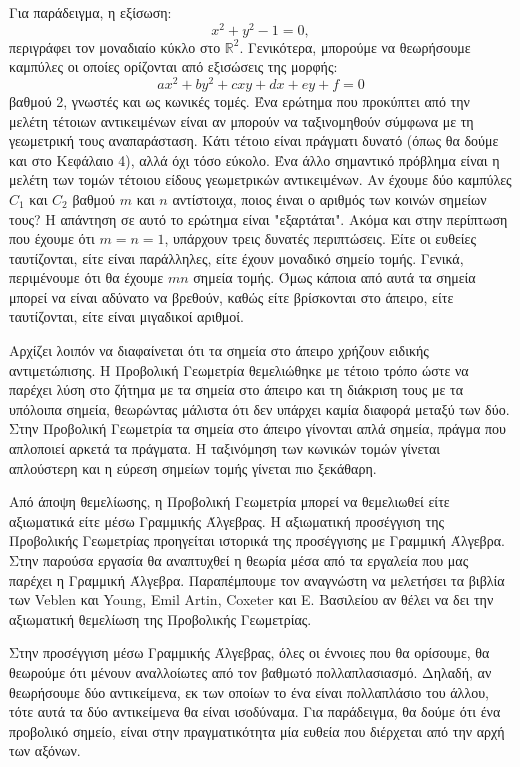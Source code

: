 \documentclass[12pt, a4paper]{book}
\begin{document}
Για παράδειγμα, η εξίσωση:
\begin{equation}
x^2+y^2-1=0,
\end{equation}
περιγράφει τον μοναδιαίο κύκλο στο $\mathbb{R}^2$. Γενικότερα, μπορούμε να θεωρήσουμε καμπύλες οι οποίες ορίζονται από εξισώσεις της μορφής:
\begin{equation}
ax^2+ by^2+cxy+dx+ey+f=0
\end{equation}
βαθμού 2, γνωστές και ως κωνικές τομές. Ένα ερώτημα που προκύπτει από την μελέτη τέτοιων αντικειμένων είναι αν μπορούν να ταξινομηθούν σύμφωνα με τη γεωμετρική τους αναπαράσταση. Κάτι τέτοιο είναι πράγματι δυνατό (όπως θα δούμε και στο Κεφάλαιο 4), αλλά όχι τόσο εύκολο. Ένα άλλο σημαντικό πρόβλημα είναι η μελέτη των τομών τέτοιου είδους γεωμετρικών αντικειμένων. Αν έχουμε δύο καμπύλες $C_1$ και $C_2$ βαθμού $m$ και $n$ αντίστοιχα, ποιος έιναι ο αριθμός των κοινών σημείων τους? Η απάντηση σε αυτό το ερώτημα είναι "εξαρτάται". Ακόμα και στην περίπτωση που έχουμε ότι $m=n=1$, υπάρχουν τρεις δυνατές περιπτώσεις. Είτε οι ευθείες ταυτίζονται, είτε είναι παράλληλες, είτε έχουν μοναδικό σημείο τομής. Γενικά, περιμένουμε ότι θα έχουμε $mn$ σημεία τομής. Όμως κάποια από αυτά τα σημεία μπορεί να είναι αδύνατο να βρεθούν, καθώς είτε βρίσκονται στο άπειρο,  είτε ταυτίζονται, είτε είναι μιγαδικοί αριθμοί.
 
Αρχίζει λοιπόν να διαφαίνεται ότι τα σημεία στο άπειρο χρήζουν ειδικής αντιμετώπισης. Η Προβολική Γεωμετρία θεμελιώθηκε με τέτοιο τρόπο ώστε να παρέχει λύση στο ζήτημα με τα σημεία στο άπειρο και τη διάκριση τους με τα υπόλοιπα σημεία, θεωρώντας μάλιστα ότι δεν υπάρχει καμία διαφορά  μεταξύ των δύο. Στην Προβολική Γεωμετρία τα σημεία στο άπειρο γίνονται απλά σημεία, πράγμα που απλοποιεί αρκετά τα πράγματα. Η ταξινόμηση των κωνικών τομών γίνεται απλούστερη και η εύρεση σημείων τομής γίνεται πιο ξεκάθαρη.

Από άποψη θεμελίωσης, η Προβολική Γεωμετρία μπορεί να θεμελιωθεί είτε αξιωματικά είτε μέσω Γραμμικής Άλγεβρας. Η αξιωματική προσέγγιση της Προβολικής Γεωμετρίας προηγείται ιστορικά της προσέγγισης με Γραμμική Άλγεβρα. Στην παρούσα εργασία θα αναπτυχθεί η θεωρία μέσα από τα εργαλεία που μας παρέχει η Γραμμική Άλγεβρα. Παραπέμπουμε τον αναγνώστη να μελετήσει τα βιβλία των \foreignlanguage{english}{Veblen} και \foreignlanguage{english}{Young}, \foreignlanguage{english}{Emil Artin}, \foreignlanguage{english}{Coxeter} και Ε. Βασιλείου αν θέλει να δει την αξιωματική θεμελίωση της Προβολικής Γεωμετρίας.

Στην προσέγγιση μέσω Γραμμικής Άλγεβρας, όλες οι έννοιες που θα ορίσουμε, θα θεωρούμε ότι μένουν αναλλοίωτες από τον βαθμωτό πολλαπλασιασμό. Δηλαδή, αν θεωρήσουμε δύο αντικείμενα, εκ των οποίων το ένα είναι πολλαπλάσιο του άλλου, τότε αυτά τα δύο αντικείμενα θα είναι ισοδύναμα. Για παράδειγμα, θα δούμε ότι ένα προβολικό σημείο, είναι στην πραγματικότητα μία ευθεία που διέρχεται από την αρχή των αξόνων.
\end{document}
